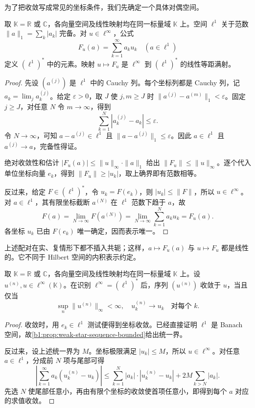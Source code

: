 \ProseParagraphBreak

为了把\WeakStar{}收敛写成常见的坐标条件，我们先确定一个具体对偶空间。

\begin{proposition}\label{b1:prop:l1-dual}
取 \(\mathbb K=\mathbb R\) 或 \(\mathbb C\)，各向量空间及线性映射均在同一标量域 \(\mathbb K\) 上。空间 \(\ell^1\) 关于范数 \(\|a\|_1=\sum_k|a_k|\) 完备。对 \(u\in\ell^\infty\)，公式
\[
 F_u(a)=\sum_{k=1}^{\infty}a_ku_k\quad(a\in\ell^1)
\]
定义 \((\ell^1)^*\) 中的元素。映射 \(u\mapsto F_u\) 是 \(\ell^\infty\) 到 \((\ell^1)^*\) 的线性等距满射。
\end{proposition}
\begin{proof}
先设 \((a^{(j)})\) 是 \(\ell^1\) 中的 Cauchy 列。每个坐标列都是 Cauchy 列，记 \(a_k=\lim_j a_k^{(j)}\)。给定 \(\varepsilon>0\)，取 \(J\) 使 \(j,m\geq J\) 时 \(\|a^{(j)}-a^{(m)}\|_1<\varepsilon\)。固定 \(j\geq J\)，对任意 \(N\) 令 \(m\to\infty\)，得到
\[
 \sum_{k=1}^N|a_k^{(j)}-a_k|\leq\varepsilon.
\]
令 \(N\to\infty\)，可知 \(a-a^{(j)}\in\ell^1\) 且 \(\|a-a^{(j)}\|_1\leq\varepsilon\)。因此 \(a\in\ell^1\) 且 \(a^{(j)}\to a\)，完备性得证。

绝对收敛性和估计 \(|F_u(a)|\leq\|u\|_\infty\cdot\|a\|_1\) 给出 \(\|F_u\|\leq\|u\|_\infty\)。逐个代入单位坐标向量 \(e_k\)，得到 \(\|F_u\|\geq|u_k|\)，取上确界即有范数相等。

反过来，给定 \(F\in(\ell^1)^*\)，令 \(u_k=F(e_k)\)，则 \(|u_k|\leq\|F\|\)，所以 \(u\in\ell^\infty\)。对 \(a\in\ell^1\)，其有限坐标截断 \(a^{(N)}\) 在 \(\ell^1\) 范数下趋于 \(a\)，故
\[
 F(a)=\lim_{N\to\infty}F(a^{(N)})
 =\lim_{N\to\infty}\sum_{k=1}^N a_ku_k=F_u(a).
\]
各坐标 \(u_k\) 已由 \(F(e_k)\) 唯一确定，因而表示唯一。
\end{proof}

上述配对在实、复情形下都不插入共轭；这样，\(a\mapsto F_u(a)\) 与 \(u\mapsto F_u\) 都是线性的。它不同于 Hilbert 空间的内积表示约定。

\begin{corollary}\label{b1:cor:linfty-weak-star-coordinate}
取 \(\mathbb K=\mathbb R\) 或 \(\mathbb C\)，各向量空间及线性映射均在同一标量域 \(\mathbb K\) 上。设 \(u^{(n)},u\in\ell^\infty(\mathbb K)\)。在识别 \(\ell^\infty=(\ell^1)^*\) 后，序列 \((u^{(n)})\) \WeakStar{}收敛于 \(u\)，当且仅当
\[
 \sup_n\|u^{(n)}\|_\infty<\infty,
 \quad u_k^{(n)}\longrightarrow u_k\quad\text{对每个 }k.
\]
\end{corollary}
\begin{proof}
\WeakStar{}收敛时，用 \(e_k\in\ell^1\) 测试便得到坐标收敛。已经直接证明 \(\ell^1\) 是 Banach 空间，故\cref{b1:prop:weak-star-sequence-bounded}给出统一界。

反过来，设上述统一界为 \(M\)。坐标极限满足 \(|u_k|\leq M\)，所以 \(u\in\ell^\infty\)。对任意 \(a\in\ell^1\)，分成前 \(N\) 项与尾部可得
\[
 \left|\sum_{k=1}^{\infty}a_k(u_k^{(n)}-u_k)\right|
 \leq\sum_{k=1}^N|a_k|\cdot|u_k^{(n)}-u_k|
      +2M\sum_{k>N}|a_k|.
\]
先选 \(N\) 使尾部任意小，再由有限个坐标的收敛使首项任意小，即得到每个 \(a\) 对应的求值收敛。
\end{proof}

